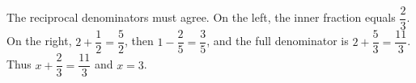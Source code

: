 The reciprocal denominators must agree. On the left, the inner fraction equals $\dfrac{2}{3}$. On the right, $2+\dfrac{1}{2}=\dfrac{5}{2}$, then $1-\dfrac{2}{5}=\dfrac{3}{5}$, and the full denominator is $2+\dfrac{5}{3}=\dfrac{11}{3}$. Thus $x+\dfrac{2}{3}=\dfrac{11}{3}$ and $\boxed{x=3}$.
